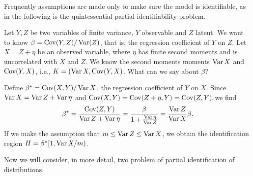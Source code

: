 Frequently assumptions are made only to make sure the model is identifiable, as in the following is the quintessential partial identifiability problem.
\begin{example}
Let $Y,Z$ be two variables of finite variance, $Y$ observable and $Z$ latent. We want to know $\beta=\operatorname{Cov}(Y,Z)/\operatorname{Var}(Z)$, that is, the regression coefficient of $Y$ on $Z$. Let $X=Z+\eta$ be an observed variable, where $\eta$ has finite second moments and is uncorrelated with $X$ and $Z$. We know the second moments moments $\operatorname{Var} X$ and $\operatorname{Cov}(Y,X)$, i.e., $K=(\operatorname{Var} X,\operatorname{Cov}(Y,X)$. What can we say about $\beta$? 

Define $\beta^{\star}=\operatorname{Cov}(X,Y)/\operatorname{Var} X$, the regression coefficient of $Y$ on $X$. Since $\operatorname{Var} X=\operatorname{Var} Z+\operatorname{Var}\eta$
and $\operatorname{Cov}(X,Y)=\operatorname{Cov}(Z+\eta,Y)=\operatorname{Cov}(Z,Y),$we find
\[
\beta^{\star}=\frac{\operatorname{Cov}(Z,Y)}{\operatorname{Var} Z+\operatorname{Var}\eta}=\frac{\beta}{1+\frac{\operatorname{Var}\eta}{\operatorname{Var} Z}}=\frac{\operatorname{Var} Z}{\operatorname{Var} X}\beta.
\]
If we make the assumption that $m\leq\operatorname{Var} Z\leq\operatorname{Var} X$, we obtain
the identification region $H=\beta^{\star}[1,\operatorname{Var} X/m)$. 
\end{example}

Now we will consider, in more detail, two problem of partial identification of distributions.

